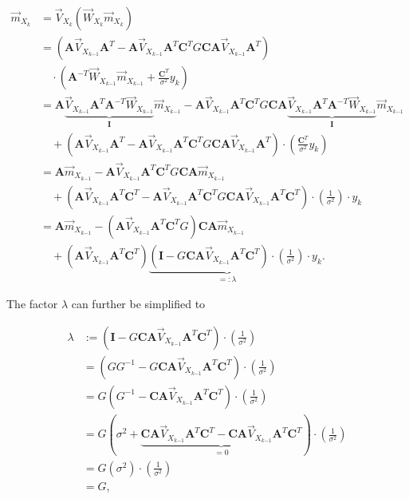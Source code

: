 \documentclass[11pt,a4paper,twoside]{report}
\newcommand{\messF}[3]{\overrightarrow{#1}_{{#2}_{k{#3}}}}
\newcommand{\mat}[1]{\mathbf{#1}}
\begin{document}
\begin{align}
	\label{eq: update rule, mean vector}
	\messF{m}{X}{} &= \messF{V}{X}{} \left( \messF{W}{X}{}\messF{m}{X}{} \right) \\
	&= \left(\mat{A}\messF{V}{X}{-1}\mat{A}^T - \mat{A}\messF{V}{X}{-1}\mat{A}^T \mat{C}^T G\mat{C}\mat{A}\messF{V}{X}{-1}\mat{A}^T\right) \\
	&\nonumber \quad \cdot \left( \mat{A}^{-T}\messF{W}{X}{-1}\messF{m}{X}{-1} + \frac{\mat{C}^T}{\sigma^2}y_k \right) \\
	&= \mat{A} \underbrace{\messF{V}{X}{-1}\mat{A}^T\mat{A}^{-T}\messF{W}{X}{-1}}_{\mat{I}} \messF{m}{X}{-1} - \mat{A}\messF{V}{X}{-1}\mat{A}^T \mat{C}^T G\mat{C}\mat{A}\underbrace{\messF{V}{X}{-1}\mat{A}^T\mat{A}^{-T}\messF{W}{X}{-1}}_{\mat{I}}\messF{m}{X}{-1} \\
	&\nonumber \quad + \left(\mat{A}\messF{V}{X}{-1}\mat{A}^T - \mat{A}\messF{V}{X}{-1}\mat{A}^T \mat{C}^T G\mat{C}\mat{A}\messF{V}{X}{-1}\mat{A}^T\right) \cdot \left( \frac{\mat{C}^T}{\sigma^2}y_k \right) \\
	&= \mat{A} \messF{m}{X}{-1} - \mat{A}\messF{V}{X}{-1}\mat{A}^T \mat{C}^T G\mat{C}\mat{A}\messF{m}{X}{-1} \\
	&\nonumber \quad + \left(\mat{A}\messF{V}{X}{-1}\mat{A}^T\mat{C}^T - \mat{A}\messF{V}{X}{-1}\mat{A}^T \mat{C}^T G\mat{C}\mat{A}\messF{V}{X}{-1}\mat{A}^T\mat{C}^T\right) \cdot \left(\frac{1}{\sigma^2}\right) \cdot y_k \\
	&= \mat{A} \messF{m}{X}{-1} - \left(\mat{A}\messF{V}{X}{-1}\mat{A}^T \mat{C}^T G\right)\mat{C}\mat{A}\messF{m}{X}{-1} \\
	&\nonumber \quad + \left(\mat{A}\messF{V}{X}{-1}\mat{A}^T\mat{C}^T\right) \underbrace{\left(\mat{I} - G\mat{C}\mat{A}\messF{V}{X}{-1}\mat{A}^T\mat{C}^T\right) \cdot \left(\frac{1}{\sigma^2}\right)}_{=:\lambda} \cdot y_k.
\end{align}

The factor $\lambda$ can further be simplified to

\begin{align}
	\label{eq: lambda factor}
	\lambda &:= \left(\mat{I} - G\mat{C}\mat{A}\messF{V}{X}{-1}\mat{A}^T\mat{C}^T\right) \cdot \left(\frac{1}{\sigma^2}\right) \\
	&= \left(GG^{-1} - G\mat{C}\mat{A}\messF{V}{X}{-1}\mat{A}^T\mat{C}^T\right) \cdot \left(\frac{1}{\sigma^2}\right) \\
	&= G\left(G^{-1} - \mat{C}\mat{A}\messF{V}{X}{-1}\mat{A}^T\mat{C}^T\right) \cdot \left(\frac{1}{\sigma^2}\right) \\
	&= G\left(\sigma^2 + \underbrace{\mat{C} \mat{A}\messF{V}{X}{-1} \mat{A}^T\mat{C}^T - \mat{C}\mat{A}\messF{V}{X}{-1}\mat{A}^T\mat{C}^T}_{=0}\right) \cdot \left(\frac{1}{\sigma^2}\right) \\
	&= G\left(\sigma^2 \right) \cdot \left(\frac{1}{\sigma^2}\right) \\
	&= G,
\end{align}
\end{document}
